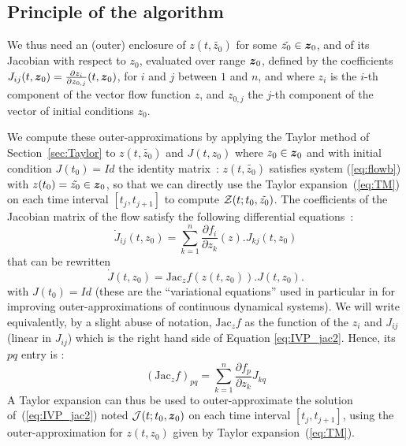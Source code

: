 \documentclass{sig-alternate-05-2015} %
\begin{document}
\subsection{Principle of the algorithm}

\label{principle}

We thus need an (outer) enclosure of $z(t,\tilde{z_0})$ for some $\tilde{z_0} \in \z_0$, and of its Jacobian with respect to $z_0$, evaluated over range $\z_0$, 
defined by the coefficients $J_{ij}(t,\z_0)=\frac{\partial z_i}{\partial z_{0,j}}(t,\z_0)$, for $i$ and $j$ between $1$ and $n$, and where $z_i$ is the $i$-th 
component of the vector flow function $z$, and $z_{0,j}$ the $j$-th component of the vector of initial conditions $z_0$. 

We compute these outer-approximations by applying the Taylor method of Section~\ref{sec:Taylor} to  $z(t,\tilde{z_0})$ 
and $J(t,z_0)$ where $z_0 \in \z_0$ and with initial condition $J(t_0)=Id$ the identity matrix~: $z(t,\tilde{z_0})$ satisfies system  (\ref{eq:flowb}) with $z(t_0)=\tilde{z_0}\in \z_0$, so that we can directly 
use the Taylor expansion~(\ref{eq:TM}) on each time interval $[t_j,t_{j+1}]$ to compute ${\cal Z}(t;t_0,\tilde{z_0})$. 
The coefficients of the Jacobian matrix of the flow satisfy the following differential equations~:
\begin{equation}
\dot{J}_{ij}(t,z_0) %
= \sum\limits_{k=1}^n \frac{\partial f_i}{\partial z_k}(z) . J_{kj}(t,z_0)
\label{eq:IVP_jac}
\end{equation} 
 that can be rewritten
\begin{equation}
\dot{J}(t,z_0) =  \mbox{Jac}_z f(z(t,z_0)) . J(t,z_0).
\label{eq:IVP_jac2}
\end{equation} 
with $J(t_0)=Id$ (these are the ``variational equations'' used in particular in \cite{Zgliczynski2002}
for improving outer-approximations of continuous dynamical systems).
We will write equivalently, by a slight abuse of notation, 
$\mbox{Jac}_z f$ as the function of the $z_i$ and $J_{ij}$ (linear in $J_{ij}$) which is
the right hand side of Equation \ref{eq:IVP_jac2}. Hence, its $pq$ entry is : 
\begin{equation}
(\mbox{Jac}_z f)_{pq} = \sum\limits_{k=1}^n \frac{\partial f_p}{\partial z_k} J_{kq}
\label{pqentry}
\end{equation}
A Taylor expansion can thus be used to outer-approximate the solution of~(\ref{eq:IVP_jac2}) noted ${\cal J}(t;t_0,\z_0)$ on each time interval  $[t_j,t_{j+1}]$, 
using the outer-approximation for $z(t,z_0)$ given by Taylor expansion~(\ref{eq:TM}).
\end{document}
